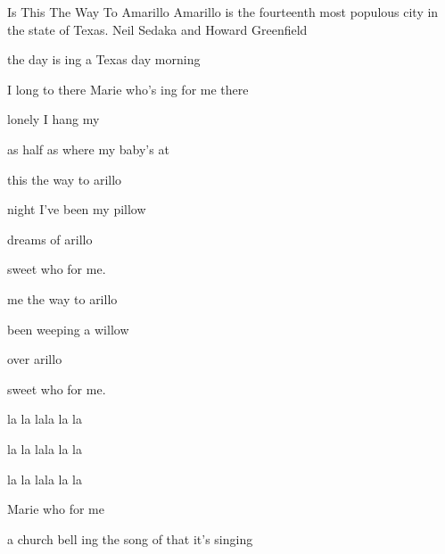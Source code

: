\begin{SBSong}{Is This The Way To Amarillo}
  {Amarillo is the fourteenth most populous city in the state of Texas.}
  {Neil Sedaka and Howard Greenfield}
  \begin{SBVerse}
     the day is ing  a Texas day morning
    
     I long to  there  Marie who's ing for me there
    
     lonely   I hang my 
    
     as half as   where my baby's at
  \end{SBVerse}
  \begin{SBChorus}
     this the way to arillo 
    
     night I've been  my pillow 
    
    dreams of arillo 
    
     sweet  who  for me.
    
     me the way to arillo 
    
     been weeping  a willow 
    
     over arillo 
    
     sweet  who  for me.
  \end{SBChorus}
  \begin{SBVerse}
     la la lala la la  
    
     la la lala la la  
     
     la la lala la la 
    
     Marie who  for me
    
     a church bell ing  the song of  that it's singing
    

\end{SBVerse}
\end{SBSong}

